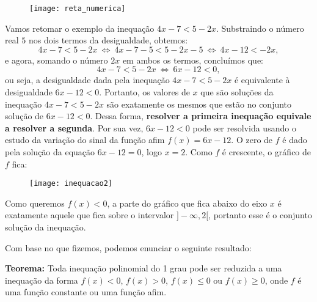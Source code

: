 \begin{figure}[H]
\centering
\noindent\texttt{[image: reta\_numerica]}
\end{figure}

Vamos retomar o exemplo da inequação $4x-7 < 5-2x$. Substraindo o número real $5$ nos dois termos da desigualdade, obtemos:
$$
4x-7 < 5 - 2x \ \iff \ 4x - 7 - 5 < 5 - 2x - 5 \ \iff \ 4x - 12 < - 2x,
$$
e agora, somando o número $2x$ em ambos os termos, concluímos que:
$$
4x - 7 < 5 - 2x \ \iff \ 6x -12 < 0, 
$$
ou seja, a desigualdade dada pela inequação $4x - 7 < 5 - 2x$ é equivalente à desigualdade $6x - 12 < 0$. Portanto, os valores de $x$ que são soluções da inequação $4x - 7 < 5 - 2x$ são exatamente os mesmos que estão no conjunto solução de $6x - 12 <0$. Dessa forma, \textbf{resolver a primeira inequação equivale a resolver a segunda}. Por sua vez, $6x - 12 < 0$ pode ser resolvida usando o estudo da variação do sinal da função afim $f(x) = 6x - 12$. O zero de $f$ é dado pela solução da equação $6x - 12 = 0$, logo $x = 2$. Como $f$ é crescente, o gráfico de $f$ fica:

   \begin{figure}[H]
\centering
\noindent\texttt{[image: inequacao2]}
\end{figure}

Como queremos $f(x) < 0$, a parte do gráfico que fica abaixo do eixo $x$ é exatamente aquele que fica sobre o intervalor $]-\infty, 2[$, portanto esse é o conjunto solução da inequação.

Com base no que fizemos, podemos enunciar o seguinte resultado:

\begin{observation}
\textbf{Teorema:} Toda inequação polinomial do 1 grau pode ser reduzida a uma inequação da forma $f(x) <0$, $f(x) > 0$, $f(x) \leq 0$ ou $f(x) \geq 0$, onde $f$ é uma função constante ou uma função afim.

\end{observation}

